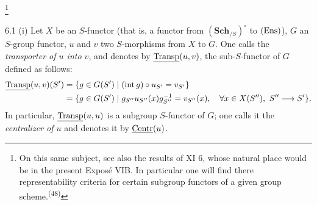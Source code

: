 \begingroup\renewcommand{\thefootnote}{*}\addtocounter{footnote}{-1}\footnote{On this same subject, see also the results of XI 6, whose natural place would be in the present Exposé VIB. In particular one will find there representability criteria for certain subgroup functors of a given group scheme.\textsuperscript{(48)}}\endgroup
{}
\begin{definition}{6.1}\label{VIB.6.1}
(i) Let $X$ be an $S$-functor (that is, a functor from $(\mathbf{Sch}_{/S})^\circ$ to $\textup{(Ens)}$), $G$ an $S$-group functor, $u$ and $v$ two $S$-morphisms from $X$ to $G$. One calls the \emph{transporter of $u$ into $v$}, and denotes by $\underline{\operatorname{Transp}}(u,v)$, the sub-$S$-functor of $G$ defined as follows:
\[
\begin{aligned}
\uTransp(u,v)(S')&=\{g\in G(S')\mid(\mathrm{int}\,g)\circ u_{S'}=v_{S'}\}\\
&=\{g\in G(S')\mid g_{S''}u_{S''}(x)g_{S''}^{-1}=v_{S''}(x),\quad\forall x\in X(S''),\ S''\to S'\}.
\end{aligned}
\]
In particular, $\underline{\operatorname{Transp}}(u,u)$ is a subgroup $S$-functor of $G$; one calls it the \emph{centralizer of $u$} and denotes it by $\underline{\mathrm{Centr}}(u)$.


\end{definition}
